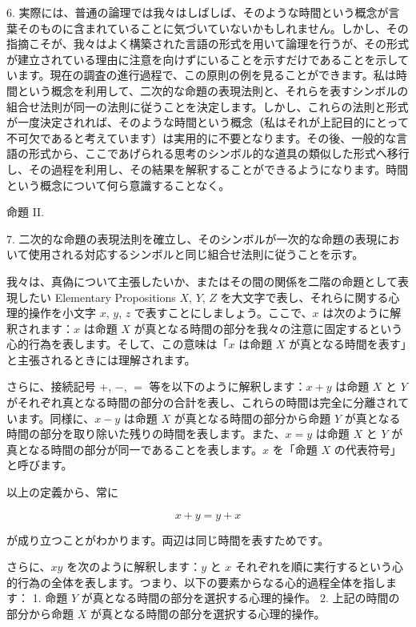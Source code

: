 \documentclass[a4paper,11pt,openany]{ltjsbook}
\begin{document}
6. 実際には、普通の論理では我々はしばしば、そのような時間という概念が言葉そのものに含まれていることに気づいていないかもしれません。しかし、その指摘こそが、我々はよく構築された言語の形式を用いて論理を行うが、その形式が建立されている理由に注意を向けずにいることを示すだけであることを示しています。現在の調査の進行過程で、この原則の例を見ることができます。私は時間という概念を利用して、二次的な命題の表現法則と、それらを表すシンボルの組合せ法則が同一の法則に従うことを決定します。しかし、これらの法則と形式が一度決定されれば、そのような時間という概念（私はそれが上記目的にとって不可欠であると考えています）は実用的に不要となります。その後、一般的な言語の形式から、ここであげられる思考のシンボル的な道具の類似した形式へ移行し、その過程を利用し、その結果を解釈することができるようになります。時間という概念について何ら意識することなく。

\begin{center}
\textsc{命題 II.}
\end{center}

7. 二次的な命題の表現法則を確立し、そのシンボルが一次的な命題の表現において使用される対応するシンボルと同じ組合せ法則に従うことを示す。

我々は、真偽について主張したいか、またはその間の関係を二階の命題として表現したい Elementary Propositions $X$, $Y$, $Z$ を大文字で表し、それらに関する心理的操作を小文字 $x$, $y$, $z$ で表すことにしましょう。ここで、$x$ は次のように解釈されます：$x$ は命題 $X$ が真となる時間の部分を我々の注意に固定するという心的行為を表します。そして、この意味は「$x$ は命題 $X$ が真となる時間を表す」と主張されるときには理解されます。

さらに、接続記号 $+$, $-$, $=$ 等を以下のように解釈します：$x+y$ は命題 $X$ と $Y$ がそれぞれ真となる時間の部分の合計を表し、これらの時間は完全に分離されています。同様に、$x-y$ は命題 $X$ が真となる時間の部分から命題 $Y$ が真となる時間の部分を取り除いた残りの時間を表します。また、$x=y$ は命題 $X$ と $Y$ が真となる時間の部分が同一であることを表します。$x$ を「命題 $X$ の代表符号」と呼びます。

以上の定義から、常に

\[
x + y = y + x
\]

が成り立つことがわかります。両辺は同じ時間を表すためです。

さらに、$xy$ を次のように解釈します：$y$ と $x$ それぞれを順に実行するという心的行為の全体を表します。つまり、以下の要素からなる心的過程全体を指します：
1. 命題 $Y$ が真となる時間の部分を選択する心理的操作。
2. 上記の時間の部分から命題 $X$ が真となる時間の部分を選択する心理的操作。
\end{document}
